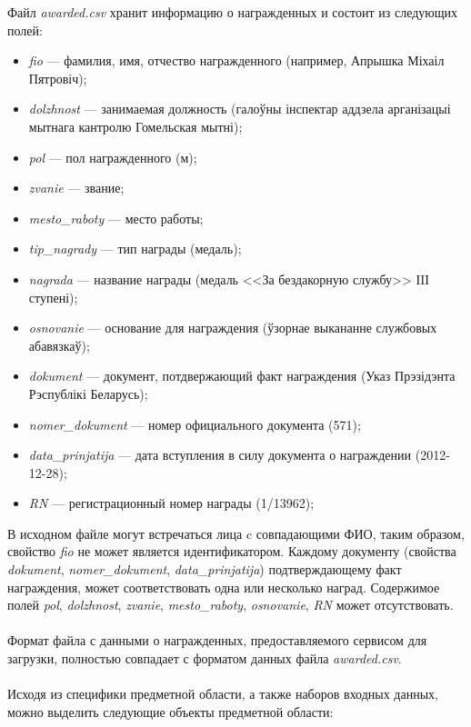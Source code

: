 Файл \textit{awarded.csv} хранит информацию о награжденных и состоит из следующих полей:
\begin{itemize}
\item
  \textit{fio} --- фамилия, имя, отчество награжденного
  (например, Апрышка Міхаіл Пятровіч);
\item
  \textit{dolzhnost} --- занимаемая должность
  (галоўны інспектар аддзела арганізацыі мытнага кантролю Гомельская мытні);
\item
  \textit{pol} --- пол награжденного (м);
\item
  \textit{zvanie} --- звание;
\item
  \textit{mesto\_raboty} --- место работы;
\item 
  \textit{tip\_nagrady} --- тип награды (медаль);
\item
  \textit{nagrada} --- название награды
  (медаль <<За бездакорную службу>> ІIІ ступені);
\item
  \textit{osnovanie} --- основание для награждения
  (ўзорнае выкананне службовых абавязкаў);
\item
  \textit{dokument} --- документ, потдвержающий факт награждения
  (Указ Прэзідэнта Рэспублікі Беларусь);
\item
  \textit{nomer\_dokument} --- номер официального документа
  (571);
\item
  \textit{data\_prinjatija} --- дата вступления в силу документа о награждении
  (2012-12-28);
\item
  \textit{RN} --- регистрационный номер награды (1/13962);
\end{itemize}

В исходном файле могут встречаться лица c совпадающими ФИО,
таким образом, свойство \textit{fio} не может является идентификатором.
Каждому документу (свойства \textit{dokument}, \textit{nomer\_dokument},
\textit{data\_prinjatija})
подтверждающему факт награждения, может соответствовать одна или несколько наград.
Содержимое полей \textit{pol}, \textit{dolzhnost}, \textit{zvanie}, 
\textit{mesto\_raboty}, \textit{osnovanie}, \textit{RN} может отсутствовать.

\paragraph{}
Формат файла с данными о награжденных, предоставляемого сервисом для загрузки,
полностью совпадает с форматом данных файла \textit{awarded.csv}.

\paragraph{}
Исходя из специфики предметной области, а также наборов входных данных,
можно выделить следующие объекты предметной области:

